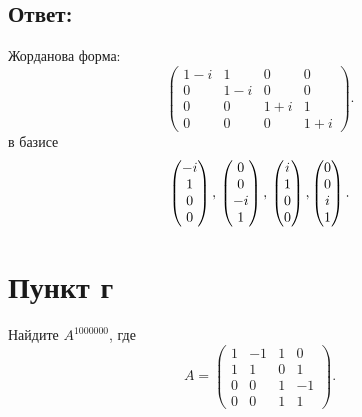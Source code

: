 \documentclass[12pt]{article}
\begin{document}
    \subsection*{Ответ:}
    Жорданова форма:
    \[
        \begin{pmatrix}
            1 - i & 1     & 0     & 0     \\
            0     & 1 - i & 0     & 0     \\
            0     & 0     & 1 + i & 1     \\
            0     & 0     & 0     & 1 + i
        \end{pmatrix}.
    \]
    в базисе
    \[
        \begin{pmatrix}
            -i \\ 1 \\ 0 \\ 0
        \end{pmatrix}, \\
        \begin{pmatrix}
            0 \\ 0 \\ -i \\ 1
        \end{pmatrix}, \\
        \begin{pmatrix}
            i \\ 1 \\ 0 \\ 0
        \end{pmatrix} ,
        \begin{pmatrix}
            0 \\ 0 \\ i \\ 1
        \end{pmatrix} .
    \]

    \section*{Пункт г}
    Найдите $A^{1000000}$, где
    \[
        A = \begin{pmatrix}
                1 & -1 & 1 & 0  \\
                1 & 1  & 0 & 1  \\
                0 & 0  & 1 & -1 \\
                0 & 0  & 1 & 1
        \end{pmatrix} .
    \]
\end{document}
